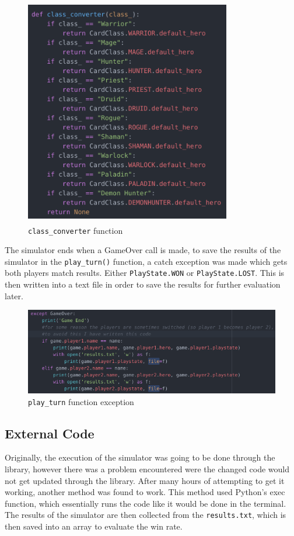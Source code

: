 \documentclass{report} %
\begin{document}
\begin{figure}[H]
\centering
\includegraphics[width=9cm, height=10cm]{classConverter}
\caption{\nolinkurl{class_converter} function \protect}
\label{board}
\end{figure}

The simulator ends when a GameOver call is made, to save the results of the simulator in the \nolinkurl{play_turn()} function, a catch exception was made which gets both players match results. Either \nolinkurl{PlayState.WON} or \nolinkurl{PlayState.LOST}. This is then written into a text file in order to save the results for further evaluation later.

\begin{figure}[H]
\centering
\includegraphics[width=1\textwidth]{playTurn}
\caption{\nolinkurl{play_turn} function exception\protect}
\label{board}
\end{figure}

\subsection{External Code}
Originally, the execution of the simulator was going to be done through the library, however there was a problem encountered were the changed code would not get updated through the library. After many hours of attempting to get it working, another method was found to work. This method used Python's exec function, which essentially runs the code like it would be done in the terminal. The results of the simulator are then collected from the \nolinkurl{results.txt}, which is then saved into an array to evaluate the win rate.
\end{document}

